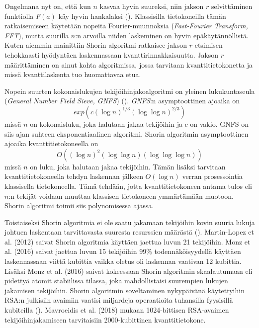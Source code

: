Ongelmana nyt on, että kun $n$ kasvaa hyvin suureksi, niin jakson $r$ selvittäminen funktiolla $F(a)$ käy hyvin hankalaksi (\cite{doi:10.1080/23742917.2016.1226650}). Klassisilla tietokoneilla tämän ratkaisemiseen käytetään nopeita Fourier-muunnoksia (\emph{Fast-Fourier Transform, FFT}), mutta suurilla $n$:n arvoilla niiden laskeminen on hyvin epäkäytännöllistä. Kuten aiemmin mainittiin Shorin algoritmi ratkaisee jakson $r$ etsimisen tehokkaasti hyödyntäen laskennassaan kvanttirinnakkaisuutta. Jakson $r$ määrittäminen on ainut kohta algoritmissa, jossa tarvitaan kvanttitietokonetta ja missä kvanttilaskenta tuo huomattavaa etua.

Nopein suurten kokonaislukujen tekijöihinjakoalgoritmi on yleinen lukukuntaseula (\emph{General Number Field Sieve, GNFS}) (\cite{doi:10.1137/S0036144598347011}). \emph{GNFS}:n asymptoottinen ajoaika on \[exp(c(\log n)^{1/3} (\log \log n)^{2/3})\] missä $n$ on kokonaisluku, joka halutaan jakaa tekijöihin ja $c$ on vakio. GNFS on siis ajan suhteen eksponentiaalinen algoritmi. Shorin algoritmin asymptoottinen ajoaika kvanttitietokoneella on \[O((\log n)^{2}(\log \log n) (\log \log \log n))\] missä $n$ on luku, joka halutaan jakaa tekijöihin. Tämän lisäksi tarvitaan kvanttitietokoneella tehdyn laskennan jälkeen $O(\log n)$ verran prosessointia klassisella tietokoneella. Tämä tehdään, jotta kvanttitietokoneen antama tulos eli $n$:n tekijät voidaan muuttaa klassisen tietokoneen ymmärtämään muotoon. Shorin algoritmi toimii siis polynomisessa ajassa.

Toistaiseksi Shorin algoritmia ei ole saatu jakamaan tekijöihin kovin suuria lukuja johtuen laskentaan tarvittavasta suuresta resurssien määrästä (\cite{martin2012experimental}). Martin-Lopez et al. (2012) saivat Shorin algoritmia käyttäen jaettua luvun 21 tekijöihin. Monz et al. (2016) saivat jaettua luvun 15 tekijöihin 99\% todennäköisyydellä käyttäen laskennassaan viittä kubittia vaikka oletus oli laskennan vaativan 12 kubittia. Lisäksi Monz et al. (2016) saivat kokeessaan Shorin algoritmin skaalautumaan eli pidettyä atomit stabiilissa tilassa, joka mahdollistaisi suurempien lukujen jakamisen tekijöihin. Shorin algoritmin soveltaminen nykypäivänä käytettyihin RSA:n julkisiin avaimiin vaatisi miljardeja operaatioita tuhansilla fyysisillä kubiteilla (\cite{bernstein2017post}). Mavroeidis et al. (2018) mukaan 1024-bittisen RSA-avaimen tekijöihinjakamiseen tarvitaisiin 2000-kubittinen kvanttitietokone.
